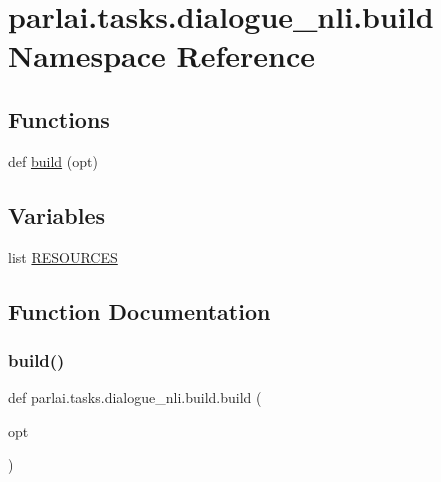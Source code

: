 \hypertarget{namespaceparlai_1_1tasks_1_1dialogue__nli_1_1build}{}\section{parlai.\+tasks.\+dialogue\+\_\+nli.\+build Namespace Reference}
\label{namespaceparlai_1_1tasks_1_1dialogue__nli_1_1build}
\subsection*{Functions}
\begin{DoxyCompactItemize}
\item 
def \hyperlink{namespaceparlai_1_1tasks_1_1dialogue__nli_1_1build_a93644603f76ca94864247f963ba47578}{build} (opt)
\end{DoxyCompactItemize}
\subsection*{Variables}
\begin{DoxyCompactItemize}
\item 
list \hyperlink{namespaceparlai_1_1tasks_1_1dialogue__nli_1_1build_a2d6a9ea10c5e9897f090f380fde28e40}{R\+E\+S\+O\+U\+R\+C\+ES}
\end{DoxyCompactItemize}


\subsection{Function Documentation}
\mbox{\label{namespaceparlai_1_1tasks_1_1dialogue__nli_1_1build_a93644603f76ca94864247f963ba47578}} 
\subsubsection{\texorpdfstring{build()}{build()}}
{\footnotesize\ttfamily def parlai.\+tasks.\+dialogue\+\_\+nli.\+build.\+build (\begin{DoxyParamCaption}\item[{}]{opt }\end{DoxyParamCaption})}



